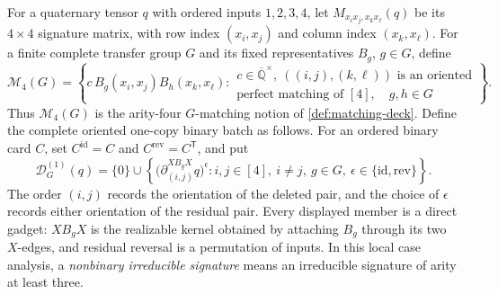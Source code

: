 \documentclass[11pt,letterpaper,onecolumn]{article}
\theoremstyle{plain}
\theoremstyle{definition}
\theoremstyle{remark}
\newcommand{\AlgNums}{\overline{\mathbb Q}}
\begin{document}
For a quaternary tensor \(q\) with ordered inputs \(1,2,3,4\), let
\(M_{x_ix_j,x_kx_\ell}(q)\) be its \(4\times4\) signature matrix, with row index
\((x_i,x_j)\) and column index \((x_k,x_\ell)\).  For a finite
complete transfer group \(G\) and its fixed representatives
\(B_g\), \(g\in G\), define
\[
 \mathcal M_4(G)=
 \left\{
 c\,B_g(x_i,x_j)B_h(x_k,x_\ell):
 \begin{array}{l}
 c\in\AlgNums^\times,\ ((i,j),(k,\ell))\text{ is an oriented}\\[-2pt]
 \text{perfect matching of }[4],\quad g,h\in G
 \end{array}
 \right\}.
\]
Thus \(\mathcal M_4(G)\) is the arity-four \(G\)-matching notion of \cref{def:matching-deck}.  Define the
complete oriented one-copy binary batch as follows.  For an ordered binary
card \(C\), set \(C^{\mathrm{id}}=C\) and
\(C^{\mathrm{rev}}=C^{\mathsf T}\), and put
\[
 \mathscr D_G^{(1)}(q)
 =
 \{0\}\cup
 \left\{
   \bigl(\partial_{(i,j)}^{XB_gX}q\bigr)^\epsilon:
   i,j\in[4],\ i\ne j,\ g\in G,\
   \epsilon\in\{\mathrm{id},\mathrm{rev}\}
 \right\}.
\]
The order \((i,j)\) records the orientation of the deleted pair, and the
choice of \(\epsilon\) records either orientation of the residual pair.
Every displayed member is a direct gadget: \(XB_gX\) is the realizable kernel
obtained by attaching
\(B_g\) through its two \(X\)-edges, and residual reversal is a permutation of inputs.  In this local case analysis, a
\emph{nonbinary irreducible signature} means an irreducible signature of arity at least
three.
\end{document}
